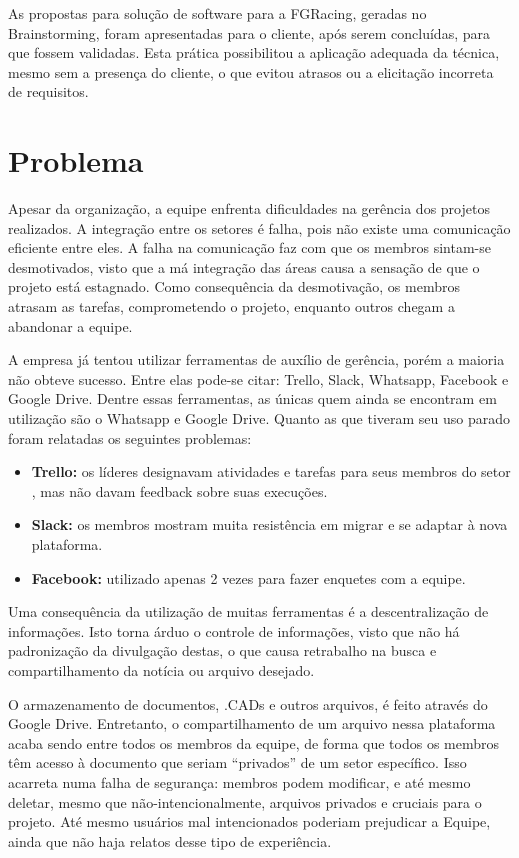 As propostas para solução de software para a FGRacing, geradas no Brainstorming, foram apresentadas para o cliente, após
serem concluídas, para que fossem validadas. Esta prática possibilitou a aplicação adequada da técnica, mesmo sem a presença
 do cliente, o que evitou atrasos ou a elicitação incorreta de requisitos.





\section{Problema}
Apesar da organização, a equipe enfrenta dificuldades na gerência dos projetos realizados. A integração entre os setores é falha,
 pois não existe uma comunicação eficiente entre eles. A falha na comunicação faz com que os membros sintam-se desmotivados,
  visto que a má integração das áreas causa a sensação de que o projeto está estagnado. Como consequência da desmotivação,
  os membros atrasam as tarefas, comprometendo o projeto, enquanto outros chegam a abandonar a equipe.

A empresa já tentou utilizar ferramentas de auxílio de gerência, porém a maioria não obteve sucesso. Entre elas pode-se
 citar: Trello, Slack, Whatsapp, Facebook e Google Drive. Dentre essas ferramentas, as únicas quem ainda se encontram
 em utilização são o Whatsapp e Google Drive. Quanto as que tiveram seu uso parado foram relatadas os seguintes problemas:

\begin{itemize}
  \item \textbf{Trello:} os líderes designavam atividades e tarefas para seus membros do setor , mas não davam feedback sobre suas execuções.
  \item \textbf{Slack:} os membros mostram muita resistência em migrar e se adaptar à nova plataforma.
  \item \textbf{Facebook:} utilizado apenas 2 vezes para fazer enquetes com a equipe.
\end{itemize}

Uma consequência da utilização de muitas ferramentas é a descentralização de informações. Isto torna árduo o controle de
informações, visto que não há padronização da divulgação destas, o que causa retrabalho na busca e compartilhamento da notícia
ou arquivo desejado.

O armazenamento de  documentos, .CADs e outros arquivos, é feito através do Google Drive. Entretanto, o compartilhamento de
 um arquivo nessa plataforma acaba sendo entre todos os membros da equipe, de forma que todos os membros têm acesso à
 documento que seriam “privados” de um setor específico. Isso acarreta numa falha de segurança: membros podem modificar, e
  até mesmo deletar, mesmo que não-intencionalmente, arquivos privados e cruciais para o projeto. Até mesmo usuários mal
  intencionados poderiam prejudicar a Equipe, ainda que não haja relatos desse tipo de experiência.

